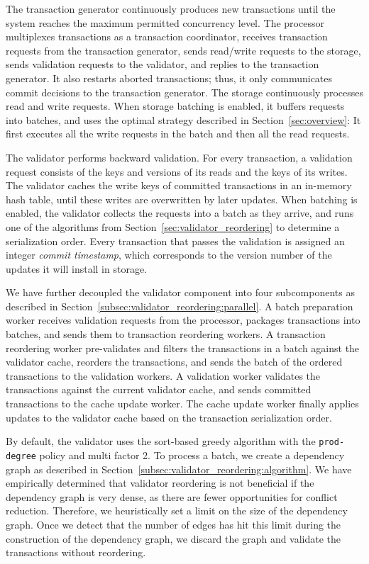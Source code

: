 The transaction generator continuously produces new transactions until the system reaches the maximum permitted concurrency level. The processor multiplexes transactions as a transaction coordinator, receives transaction requests from the transaction generator, sends read/write requests to the storage, sends validation requests to the validator, and replies to the transaction generator. It also restarts aborted transactions; thus, it only communicates commit decisions to the transaction generator. 
The storage continuously processes read and write requests. When storage batching is enabled, it buffers requests into batches, and uses the optimal strategy described in Section~\ref{sec:overview}: It first executes all the write requests in the batch  and then all the read requests. 

The validator performs backward validation. For every transaction, a validation request consists of the keys and versions of its reads and the keys of its writes. The validator caches the write keys of committed transactions in an in-memory hash table, until these writes are overwritten by later updates. When batching is enabled, the validator collects the requests into a batch as they arrive, and runs one of the algorithms from Section~\ref{sec:validator_reordering} to determine a serialization order. Every transaction that passes the validation is assigned an integer \emph{commit timestamp}, which corresponds to the version number of the updates it will install in storage. 

We have further decoupled the validator component into four subcomponents as described in Section~\ref{subsec:validator_reordering:parallel}. A batch preparation worker receives validation requests from the processor, packages transactions into batches, and sends them to transaction reordering workers. A transaction reordering worker pre-validates and filters the transactions in a batch against the validator cache, reorders the transactions, and sends the batch of the ordered transactions to the validation workers. A validation worker validates the transactions against the current validator cache, and sends committed transactions to the cache update worker. The cache update worker finally applies updates to the validator cache based on the transaction serialization order. 

By default, the validator uses the sort-based greedy algorithm with the \texttt{prod-degree} policy and multi factor 2. To process a batch, we create a dependency graph as described in Section~\ref{subsec:validator_reordering:algorithm}. We have empirically determined that validator reordering is not beneficial if the dependency graph is very dense, as there are fewer opportunities for conflict reduction. Therefore, we heuristically set a limit on the size of the dependency graph. Once we detect that the number of edges has hit this limit during the construction of the dependency graph, we discard the graph and validate the transactions without reordering. 

